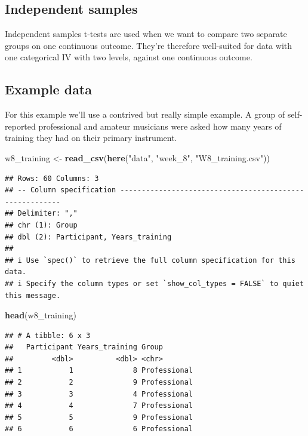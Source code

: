 \documentclass[
]{book}
\newenvironment{Shaded}{\begin{snugshade}}{\end{snugshade}}
\newcommand{\FunctionTok}[1]{\textcolor[rgb]{0.13,0.29,0.53}{\textbf{#1}}}
\newcommand{\NormalTok}[1]{#1}
\newcommand{\OtherTok}[1]{\textcolor[rgb]{0.56,0.35,0.01}{#1}}
\newcommand{\StringTok}[1]{\textcolor[rgb]{0.31,0.60,0.02}{#1}}
\begin{document}
\hypertarget{independent-samples}{%
\subsection{Independent samples}\label{independent-samples}}

Independent samples t-tests are used when we want to compare two separate groups on one continuous outcome. They're therefore well-suited for data with one categorical IV with two levels, against one continuous outcome.

\hypertarget{example-data-1}{%
\subsection{Example data}\label{example-data-1}}

For this example we'll use a contrived but really simple example. A group of self-reported professional and amateur musicians were asked how many years of training they had on their primary instrument.

\begin{Shaded}
\begin{Highlighting}[]
\NormalTok{w8\_training }\OtherTok{\textless{}{-}} \FunctionTok{read\_csv}\NormalTok{(}\FunctionTok{here}\NormalTok{(}\StringTok{"data"}\NormalTok{, }\StringTok{"week\_8"}\NormalTok{, }\StringTok{"W8\_training.csv"}\NormalTok{))}
\end{Highlighting}
\end{Shaded}

\begin{verbatim}
## Rows: 60 Columns: 3
## -- Column specification --------------------------------------------------------
## Delimiter: ","
## chr (1): Group
## dbl (2): Participant, Years_training
## 
## i Use `spec()` to retrieve the full column specification for this data.
## i Specify the column types or set `show_col_types = FALSE` to quiet this message.
\end{verbatim}

\begin{Shaded}
\begin{Highlighting}[]
\FunctionTok{head}\NormalTok{(w8\_training)}
\end{Highlighting}
\end{Shaded}

\begin{verbatim}
## # A tibble: 6 x 3
##   Participant Years_training Group       
##         <dbl>          <dbl> <chr>       
## 1           1              8 Professional
## 2           2              9 Professional
## 3           3              4 Professional
## 4           4              7 Professional
## 5           5              9 Professional
## 6           6              6 Professional
\end{verbatim}
\end{document}
